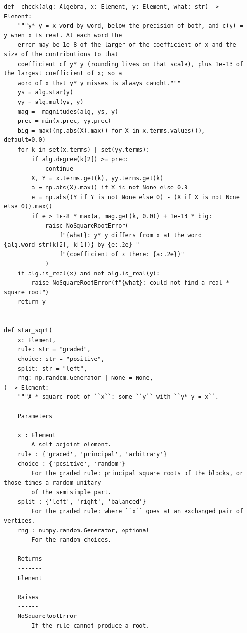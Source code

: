 \documentclass[12pt, a4paper]{report}
\theoremstyle{plain}
\theoremstyle{definition}
\theoremstyle{remark}
\theoremstyle{plain}
\begin{document}
\begin{lstlisting}[style=dsqcode]
def _check(alg: Algebra, x: Element, y: Element, what: str) -> Element:
    """y* y = x word by word, below the precision of both, and c(y) = y when x is real. At each word the
    error may be 1e-8 of the larger of the coefficient of x and the size of the contributions to that
    coefficient of y* y (rounding lives on that scale), plus 1e-13 of the largest coefficient of x; so a
    word of x that y* y misses is always caught."""
    ys = alg.star(y)
    yy = alg.mul(ys, y)
    mag = _magnitudes(alg, ys, y)
    prec = min(x.prec, yy.prec)
    big = max((np.abs(X).max() for X in x.terms.values()), default=0.0)
    for k in set(x.terms) | set(yy.terms):
        if alg.degree(k[2]) >= prec:
            continue
        X, Y = x.terms.get(k), yy.terms.get(k)
        a = np.abs(X).max() if X is not None else 0.0
        e = np.abs((Y if Y is not None else 0) - (X if X is not None else 0)).max()
        if e > 1e-8 * max(a, mag.get(k, 0.0)) + 1e-13 * big:
            raise NoSquareRootError(
                f"{what}: y* y differs from x at the word {alg.word_str(k[2], k[1])} by {e:.2e} "
                f"(coefficient of x there: {a:.2e})"
            )
    if alg.is_real(x) and not alg.is_real(y):
        raise NoSquareRootError(f"{what}: could not find a real *-square root")
    return y


def star_sqrt(
    x: Element,
    rule: str = "graded",
    choice: str = "positive",
    split: str = "left",
    rng: np.random.Generator | None = None,
) -> Element:
    """A *-square root of ``x``: some ``y`` with ``y* y = x``.

    Parameters
    ----------
    x : Element
        A self-adjoint element.
    rule : {'graded', 'principal', 'arbitrary'}
    choice : {'positive', 'random'}
        For the graded rule: principal square roots of the blocks, or those times a random unitary
        of the semisimple part.
    split : {'left', 'right', 'balanced'}
        For the graded rule: where ``x`` goes at an exchanged pair of vertices.
    rng : numpy.random.Generator, optional
        For the random choices.

    Returns
    -------
    Element

    Raises
    ------
    NoSquareRootError
        If the rule cannot produce a root.


\end{lstlisting}
\end{document}
